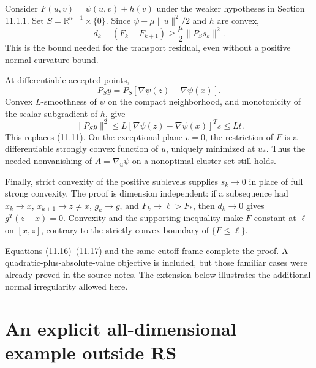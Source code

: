 Consider \(F(u,v)=\psi(u,v)+h(v)\) under the weaker hypotheses in
Section 11.1.1. Set \(S=\mathbb R^{n-1}\times\{0\}\). Since
\(\psi-\mu\|u\|^2/2\) and \(h\) are convex, \[
 d_k-(F_k-F_{k+1})\ge\frac\mu2\|P_Ss_k\|^2.\tag{11.16}
\] This is the bound needed for the transport residual, even without a
positive normal curvature bound.

At differentiable accepted points, \[
 P_Sy=P_S[\nabla\psi(z)-\nabla\psi(x)].
\] Convex \(L\)-smoothness of \(\psi\) on the compact neighborhood, and
monotonicity of the scalar subgradient of \(h\), give \[
 \|P_Sy\|^2
 \le L[\nabla\psi(z)-\nabla\psi(x)]^Ts
 \le Lt.\tag{11.17}
\] This replaces (11.11). On the exceptional plane \(v=0\), the restriction
of \(F\) is a differentiable strongly convex function of \(u\), uniquely
minimized at \(u_*\). Thus the needed nonvanishing of \(A=\nabla_u\psi\)
on a nonoptimal cluster set still holds.

Finally, strict convexity of the positive sublevels supplies \(s_k\to0\)
in place of full strong convexity. The proof is dimension independent:
if a subsequence had \(x_k\to x\), \(x_{k+1}\to z\ne x\), \(g_k\to g\),
and \(F_k\to\ell>F_*\), then \(d_k\to0\) gives \(g^T(z-x)=0\). Convexity
and the supporting inequality make \(F\) constant at \(\ell\) on
\([x,z]\), contrary to the strictly convex boundary of \(\{F\le\ell\}\).

Equations (11.16)--(11.17) and the same cutoff frame complete the proof. A
quadratic-plus-absolute-value objective is included, but those familiar
cases were already proved in the source notes. The extension below
illustrates the additional normal irregularity allowed here.


\setcounter{section}{6}
\setcounter{theorem}{0}
\setcounter{lemma}{0}
\setcounter{corollary}{0}
\setcounter{proposition}{0}
\setcounter{remark}{0}
\setcounter{equation}{0}


\section{An explicit all-dimensional example outside
RS}\label{U:an-explicit-all-dimensional-example-outside-rs}


